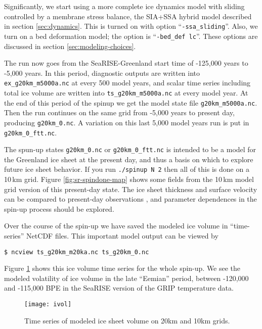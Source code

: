 Significantly, we start using a more complete ice dynamics model with sliding controlled by a membrane stress balance, the SIA+SSA hybrid model described in section \ref{sec:dynamics}.  This is turned on with option ``\texttt{-ssa_sliding}''.  Also, we turn on a bed deformation model; the option is ``\texttt{-bed_def lc}''.  These options are discussed in section \ref{sec:modeling-choices}.

The run now goes from the SeaRISE-Greenland start time of -125,000 years to -5,000 years.  In this period, diagnostic outputs are written into \texttt{ex_g20km_m5000a.nc} at every 500 model years, and scalar time series including total ice volume are written into \texttt{ts_g20km_m5000a.nc} at every model year.  At the end of this period of the spinup we get the model state file \texttt{g20km_m5000a.nc}.   Then the run continues on the same grid from -5,000 years to present day, producing \texttt{g20km_0.nc}.  A variation on this last 5,000 model years run is put in \texttt{g20km_0_ftt.nc}.

The spun-up states \texttt{g20km_0.nc} or \texttt{g20km_0_ftt.nc} is intended to be a model for the Greenland ice sheet at the present day, and thus a basis on which to explore future ice sheet behavior.  If you run \texttt{./spinup N 2} then all of this is done on a 10\,km grid.  Figure \ref{fig:sr-spindone-map} shows some fields from the 10\,km model grid version of this present-day state.  The ice sheet thickness and surface velocity can be compared to present-day observations \cite{BKAJS}, and parameter dependences in the spin-up process should be explored.

Over the course of the spin-up we have saved the modeled ice volume in ``time-series'' NetCDF files.  This important model output can be viewed by
\begin{verbatim}
$ ncview ts_g20km_m20ka.nc ts_g20km_0.nc
\end{verbatim}
\noindent Figure \ref{fig:sr-spindone-ivolboth} shows this ice volume time series for the whole spin-up.  We see the modeled volatility of ice volume in the late ``Eemian'' period, between -120,000 and -115,000 BPE in the SeaRISE version of the GRIP temperature data.

\begin{figure}[ht]
\centering
\texttt{[image: ivol]}
\caption{Time series of modeled ice sheet volume on 20km and 10km grids.}
\label{fig:sr-spindone-ivolboth}
\end{figure}

